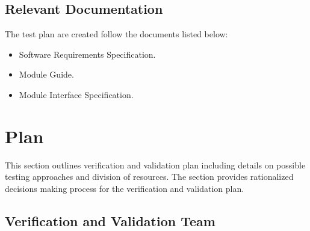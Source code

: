 \documentclass[12pt, titlepage]{article}
\begin{document}

\subsection{Relevant Documentation}
The test plan are created follow the documents listed below:
\begin{itemize}
    \item Software Requirements Specification.
    \item Module Guide.
    \item Module Interface Specification.
\end{itemize}




\section{Plan}

  
This section outlines verification and validation plan including details on possible testing approaches and division of resources. The section provides rationalized decisions making process for the verification and validation plan.

\subsection{Verification and Validation Team}
\end{document}
